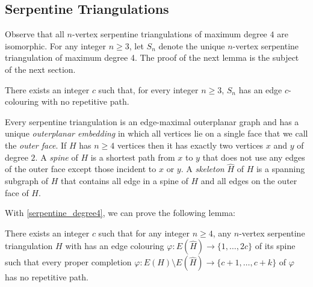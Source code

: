 \documentclass[kpfonts]{patmorin}
\begin{document}
\subsection{Serpentine Triangulations}

Observe that all $n$-vertex serpentine triangulations of maximum degree $4$ are isomorphic.  For any integer $n\ge 3$, let $S_n$ denote the unique $n$-vertex serpentine triangulation of maximum degree 4.  The proof of the next lemma is the subject of the next section.

\begin{lem}\label{serpentine_degree4}
    There exists an integer $c$ such that, for every integer $n\ge 3$, $S_n$ has an edge $c$-colouring with no repetitive path.
\end{lem}

Every serpentine triangulation is an edge-maximal outerplanar graph and has a unique \emph{outerplanar embedding} in which all vertices lie on a single face that we call the \emph{outer face}.  If $H$ has $n\ge 4$ vertices then it has exactly two vertices $x$ and $y$ of degree $2$.  A \emph{spine} of $H$ is a shortest path from $x$ to $y$ that does not use any edges of the outer face except those incident to $x$ or $y$. A \emph{skeleton} $\hat{H}$ of $H$ is a spanning subgraph of $H$ that contains all edge in a spine of $H$ and all edges on the outer face of $H$.

With \cref{serpentine_degree4}, we can prove the following lemma:

\begin{lem}\label{spine_colouring}
    There exists an integer $c$ such that for any integer $n\ge 4$, any $n$-vertex serpentine triangulation $H$ with has an edge colouring $\varphi:E(\hat{H})\to\{1,\ldots,2c\}$ of its spine such that every proper completion $\varphi:E(H)\setminus E(\hat{H})\to\{c+1,\ldots,c+k\}$ of $\varphi$ has no repetitive path.
\end{lem}
\end{document}
